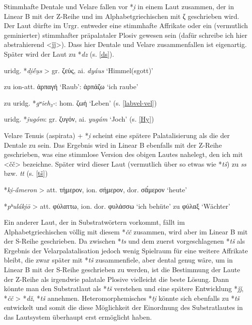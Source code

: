 \documentclass[12pt,a4paper,normalheadings]{scrartcl}
\def\rek#1{*\textit{#1}}
\def\bel#1{\textit{#1}}
\begin{document}
Stimmhafte Dentale und Velare fallen vor \rek{i̯} in einem Laut zusammen,
der in Linear B mit der Z-Reihe und im Alphabetgriechischen mit ζ
geschrieben wird.
Der Laut dürfte im Urgr. entweder eine stimmhafte Affrikate oder ein
(vermutlich geminierter) stimmhafter präpalataler Plosiv gewesen sein
(dafür schreibe ich hier abstrahierend <ǰǰ>).
Dass hier Dentale und Velare zusammenfallen ist eigenartig.
Später wird der Laut zu \rek{dz} (s. \ref{ds}).

\lex{\rek{(d, g)i̯}}{\rek{ǰǰ}}

uridg. \rek{di̯ḗu̯s} > gr. ζεύς, ai. \bel{dyáus} `Himmel(sgott)'

zu ion-att. ἁρπαγή `Raub': ἁρπάζω `ich raube'

zu uridg. \rek{gʷieh₃-}: hom. ζωή `Leben' (s. \ref{labvel-vel})

uridg. \rek{i̯ugóm}: gr. ζυγόν, ai. \bel{yugám} `Joch' (s. \ref{Hy})

\bigskip\noindent
Velare Tenuis (aspirata) + \rek{i̯} scheint eine spätere Palatalisierung
als die der Dentale zu sein.
Das Ergebnis wird in Linear B ebenfalls mit der Z-Reihe geschrieben,
was eine stimmlose Version des obigen Lautes nahelegt,
den ich mit <čč> bezeichne.
Später wird dieser Laut (vermutlich über so etwas wie \rek{tš})
zu \bel{ss} bzw. \bel{tt} (s. \ref{tš})

\lex{\rek{(k, kʰ)i̯}}{\rek{čč}}

\rek{ki̯-ā́meron} > att. τήμερον, ion. σήμερον, dor. σᾱ́μερον `heute'

\rek{pʰuláki̯ō} > att. φύλαττω, ion. dor. φυλάσσω `ich behüte' zu φύλαξ `Wächter'

\bigskip\noindent
Ein anderer Laut, der in Substratwörtern vorkommt,
fällt im Alphabetgriechischen völlig mit diesem \rek{čč} zusammen,
wird aber im Linear B mit der S-Reihe geschrieben.
Da zwischen \rek{ts} und dem zuerst vorgeschlagenen \rek{tš} als Ergebnis
der Velarpalatalisation jedoch wenig Spielraum für eine weitere Affrikate bleibt,
die zwar später mit \rek{tš} zusammenfiele, aber dental genug wäre,
um in Linear B mit der S-Reihe geschrieben zu werden,
ist die Bestimmung der Laute der Z-Reihe als irgendwie palatale Plosive
vielleicht die beste Lösung.
Dann könnte man den Substratlaut als \rek{tš} verstehen
und eine spätere Entwicklung \rek{ǰǰ}, \rek{čč} > \rek{dž}, \rek{tš} annehmen.
Heteromorphemisches \rek{ti̯} könnte sich ebenfalls zu \rek{tš} entwickelt
und somit die diese Möglichkeit der Einordnung des Substratlautes in das
Lautsystem überhaupt erst ermöglicht haben.
\end{document}
